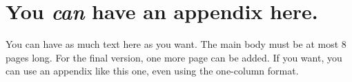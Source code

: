 \documentclass{article}
\theoremstyle{plain}
\theoremstyle{definition}
\theoremstyle{remark}
\begin{document}




\newpage
\appendix
\onecolumn
\section{You \emph{can} have an appendix here.}

You can have as much text here as you want. The main body must be at most $8$ pages long.
For the final version, one more page can be added.
If you want, you can use an appendix like this one, even using the one-column format.
\end{document}
